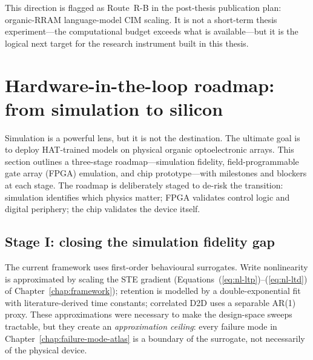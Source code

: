 This direction is flagged as Route~R-B in the post-thesis publication plan: organic-RRAM language-model CIM scaling.  It is not a short-term thesis experiment---the computational budget exceeds what is available---but it is the logical next target for the research instrument built in this thesis.


\section{Hardware-in-the-loop roadmap: from simulation to silicon}
\label{sec:hardware-roadmap}

Simulation is a powerful lens, but it is not the destination.  The ultimate goal is to deploy HAT-trained models on physical organic optoelectronic arrays.  This section outlines a three-stage roadmap---simulation fidelity, field-programmable gate array (FPGA) emulation, and chip prototype---with milestones and blockers at each stage.  The roadmap is deliberately staged to de-risk the transition: simulation identifies which physics matter; FPGA validates control logic and digital periphery; the chip validates the device itself.

\subsection{Stage I: closing the simulation fidelity gap}
\label{subsec:stage-sim}

The current framework uses first-order behavioural surrogates.  Write nonlinearity is approximated by scaling the STE gradient (Equations~(\ref{eq:nl-ltp})--(\ref{eq:nl-ltd}) of Chapter~\ref{chap:framework}); retention is modelled by a double-exponential fit with literature-derived time constants; correlated D2D uses a separable AR(1) proxy.  These approximations were necessary to make the design-space sweeps tractable, but they create an \emph{approximation ceiling}: every failure mode in Chapter~\ref{chap:failure-mode-atlas} is a boundary of the surrogate, not necessarily of the physical device.

